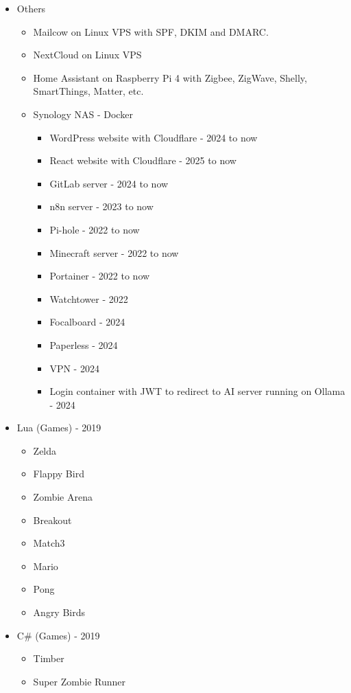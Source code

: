 {\begin{itemize}
    \item Others
    \begin{itemize}
        \item Mailcow on Linux VPS with SPF, DKIM and DMARC.
        \item NextCloud on Linux VPS
        \item Home Assistant on Raspberry Pi 4 with Zigbee, ZigWave, Shelly, SmartThings, Matter, etc.
        \item Synology NAS - Docker
        \begin{itemize}
            \item WordPress website with Cloudflare - 2024 to now
            \item React website with Cloudflare - 2025 to now
            \item GitLab server - 2024 to now
            \item n8n server - 2023 to now
            \item Pi-hole - 2022 to now
            \item Minecraft server - 2022 to now
            \item Portainer - 2022 to now
            \item Watchtower - 2022
            \item Focalboard - 2024
            \item Paperless - 2024
            \item VPN - 2024
            \item Login container with JWT to redirect to AI server running on Ollama - 2024
        \end{itemize}
    \end{itemize}

    \item Lua (Games) - 2019
    \begin{itemize}
        \item Zelda
        \item Flappy Bird
        \item Zombie Arena
        \item Breakout
        \item Match3
        \item Mario
        \item Pong
        \item Angry Birds
    \end{itemize}

    \item C\# (Games) - 2019
    \begin{itemize}
        \item Timber
        \item Super Zombie Runner
    \end{itemize}


\end{itemize}}
